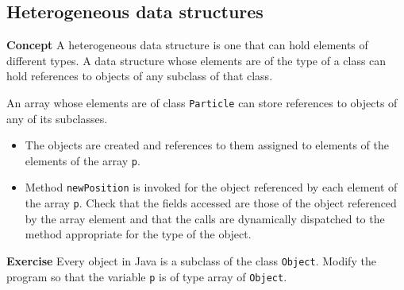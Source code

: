 \subsection{Heterogeneous data structures}\label{inher.05}

\textbf{Concept} 
A heterogeneous data structure is one that can hold elements of different types. 
A data structure whose elements are of the type of a class can hold
references to objects of any subclass of that class.


An array whose elements are of class \texttt{Particle} 
can store references to objects of any of its subclasses.
\begin{itemize}
  \item The objects are created and references to them assigned to elements
  of the elements of the array \texttt{p}.
  \item Method \texttt{newPosition} is invoked for the object referenced 
  by each element of the array \texttt{p}. 
  Check that the fields accessed are those of the object referenced by the
  array element and that the calls are dynamically dispatched to the method
  appropriate for the type of the object.
\end{itemize}

\textbf{Exercise} Every object in Java is a subclass of the class 
\texttt{Object}. Modify the program so that the variable \texttt{p} is of 
type array of \texttt{Object}.
